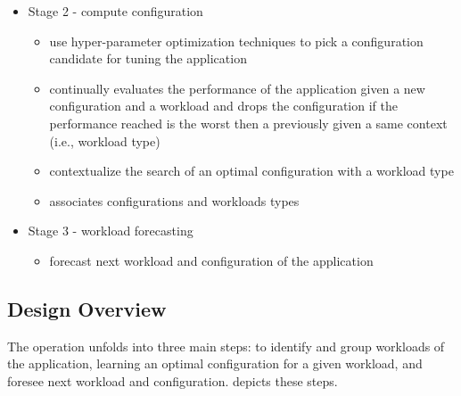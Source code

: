 \begin{itemize}
\begin{itemize}
     \end{itemize}

   \item Stage 2 - compute configuration

      \begin{itemize}

        \item use hyper-parameter optimization techniques to pick a
          configuration candidate for tuning the application

        \item continually evaluates the performance of the application given a
          new configuration and a workload and drops the configuration if the
          performance reached is the worst then a previously given a same context
          (i.e., workload type) 

        \item contextualize the search of an optimal configuration with a
          workload type

        \item associates configurations and workloads types

      \end{itemize}

   \item Stage 3 - workload forecasting

      \begin{itemize}

        \item forecast next workload and configuration of the application

      \end{itemize}
 \end{itemize}

\subsection{Design Overview}


The \name operation unfolds into three main steps: to identify and group
workloads of the application, learning an optimal configuration for a given
workload, and foresee next workload and configuration. 
depicts these steps.

